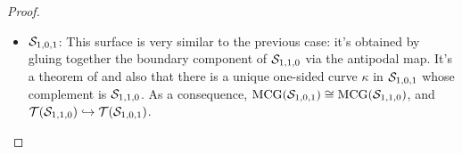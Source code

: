 \documentclass[12pt, reqno]{amsart}
\begin{document}
\begin{proof}
\begin{itemize}
  \item $\mathcal{S}_{1,0,1}$: This surface is very similar to the previous case: it's obtained by gluing together the boundary component of $\mathcal{S}_{1,1,0}$ via the antipodal map.
    It's a theorem of \textcite{scharlemann1982complex} and also \textcite{gendulphe2017whats} that there is a unique one-sided curve $\kappa$ in $\mathcal{S}_{1,0,1}$ whose complement is $\mathcal{S}_{1,1,0}$.
    As a consequence, $\mathrm{MCG}(\mathcal{S}_{1,0,1}) \cong \mathrm{MCG}(\mathcal{S}_{1,1,0})$, and $\mathcal{T}(\mathcal{S}_{1,1,0}) \hookrightarrow \mathcal{T}(\mathcal{S}_{1,0,1})$.


\end{itemize}
\end{proof}
\end{document}
